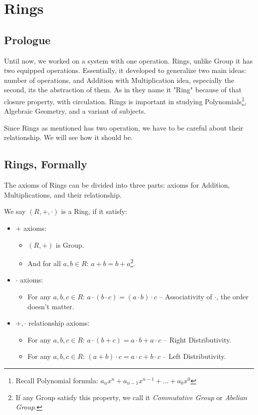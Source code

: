 \section{Rings \label{ring}}
\subsection{Prologue}
Until now, we worked on a system with one operation. Rings, unlike Group it has two equipped operations. Essentially, it developed to generalize two main ideas: number of operations, and Addition with Multiplication idea, especially the second, its the abstraction of them. As in \cite{61505} they name it "Ring" because of that closure property, with circulation. Rings is important in studying Polynomials\footnote{Recall Polynomial formula: $a_nx^n+a_{n-1}x^{n-1}+...+a_0x^{0}$}, Algebraic Geometry, and a variant of subjects.

Since Rings as mentioned has two operation, we have to be careful about their relationship. We will see how it should be.
\subsection{Rings, Formally}
The axioms of Rings can be divided into three parts: axioms for Addition, Multiplications, and their relationship.

We say $(R,+,\cdot)$ is a Ring, if it satisfy:
\begin{itemize}
    \item $+$ axioms:
    \begin{itemize}
        \item $(R,+)$ is Group. 
        \item And for all $a,b \in R$: $a+b=b+a$\footnote{If any Group satisfy this property, we call it {\it Commutative Group} or {\it Abelian Group}.}.
    \end{itemize}
    \item $\cdot$ axioms:
    \begin{itemize}
        \item For any $a,b,c \in R$: $a \cdot (b \cdot c) = (a \cdot b) \cdot c$ -- Associativity of $\cdot$, the order doesn't matter.
    \end{itemize}
    
    \item $+,\cdot $ relationship axioms:
    \begin{itemize}
        \item For any $a,b,c \in R$: $a \cdot (b + c) = a \cdot b + a \cdot c$ -- Right Distributivity.
        \item For any $a,b,c \in R$: $(a + b) \cdot c = a \cdot c + b \cdot c$ -- Left Distributivity.
    \end{itemize}
\end{itemize}

